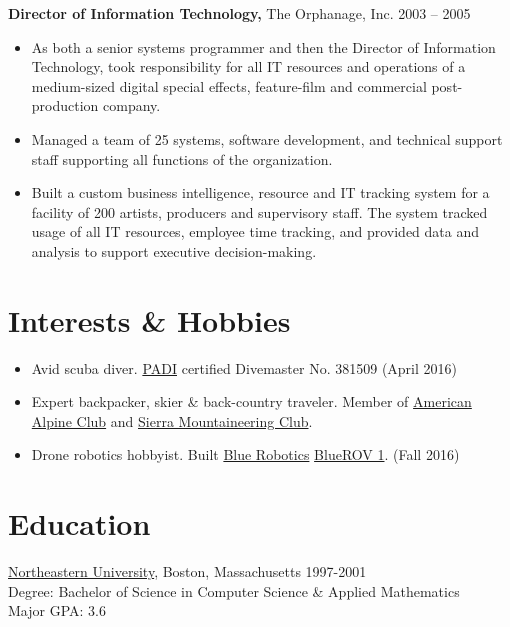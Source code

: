 \documentclass{article}
\newcommand{\resheading}[1]{\section*{#1}}
\begin{document}
{\bf Director of Information Technology,} The Orphanage, Inc. \hfill 2003 -- 2005
\begin{itemize} \itemsep -2pt

	\item As both a senior systems programmer and then the Director of Information Technology, took responsibility for all IT resources and operations of a medium-sized digital special effects, feature-film and commercial post-production company.
	
	\item Managed a team of 25 systems, software development, and technical support staff supporting all functions of the organization.
    
	\item Built a custom business intelligence, resource and IT tracking system for a facility of 200 artists, producers and supervisory staff. The system tracked usage of all IT resources, employee time tracking, and provided data and analysis to support executive decision-making.

\end{itemize}

\resheading{Interests \& Hobbies}

    \begin{itemize}\itemsep -2pt
        \item Avid scuba diver. \href{https://www.padi.com/}{PADI} certified Divemaster No. 381509 (April 2016)
        \item Expert backpacker, skier \& back-country traveler.\newline
        Member of \href{https://americanalpineclub.org/}{American Alpine Club} and \href{www.sierramountaineeringclub.org}{Sierra Mountaineering Club}.
        \item Drone robotics hobbyist. Built \href{http://bluerobotics.com/}{Blue Robotics} \href{https://www.bluerobotics.com/store/rov/bluerov-r1/}{BlueROV 1}. (Fall 2016)
    \end{itemize}

\resheading{Education}
   \href{https://www.northeastern.edu/}{Northeastern University}, Boston, Massachusetts \hfill 1997-2001\\
   Degree: Bachelor of Science in Computer Science \& Applied Mathematics\\
   Major GPA: 3.6\\





\end{document}
